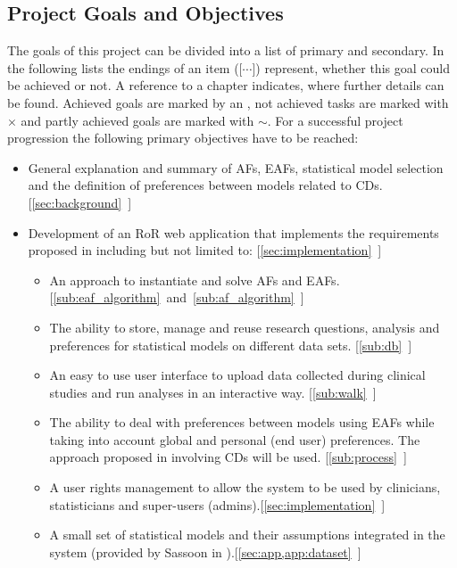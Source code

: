\subsection{Project Goals and Objectives} 
\label{sub:aims}

The goals of this project can be divided into a list of primary and secondary. In the following lists the endings of an item ([$\cdots $]) represent, whether this goal could be achieved or not. A reference to a chapter indicates, where further details can be found. Achieved goals are marked by an \checkmark, not achieved tasks are marked with $\times$ and partly achieved goals are marked with $\sim$. For a successful project progression the following primary objectives have to be reached:


\begin{itemize}
	\item General explanation and summary of \glspl{AF}, \glspl{EAF}, statistical model selection and the definition of preferences between models related to \glspl{CD}. \hfill\mbox{[\cref{sec:background} \checkmark]}
	\item Development of an \gls{RoR} web application that implements the requirements proposed in \cite{sassoon2014,sassoon2016CD} including but not limited to: \hfill\mbox{[\cref{sec:implementation} \checkmark]}
	\begin{itemize}
		\item An approach to instantiate and solve \glspl{AF} and \glspl{EAF}. \hfill\mbox{[\cref{sub:eaf_algorithm} and \ref{sub:af_algorithm} \checkmark]}
		\item The ability to store, manage and reuse research questions, analysis and preferences for statistical models on different data sets. \hfill\mbox{[\cref{sub:db} \checkmark]}
		\item An easy to use user interface to upload data collected during clinical studies and run analyses in an interactive way. \hfill\mbox{[\cref{sub:walk} \checkmark]}
		\item The ability to deal with preferences between models using \glspl{EAF} while taking into account global and personal (end user) preferences. The approach proposed in \cite{sassoon2016CD} involving \glspl{CD} will be used. \hfill\mbox{[\cref{sub:process} \checkmark]}
		\item A user rights management to allow the system to be used by clinicians, statisticians and super-users (admins).\hfill\mbox{[\cref{sec:implementation} \checkmark]}
		\item A small set of statistical models and their assumptions integrated in the system (provided by Sassoon in \cite{sassoon2016CD}).\hfill\mbox{[\cref{sec:app,app:dataset} \checkmark]}

\end{itemize}
\end{itemize}
